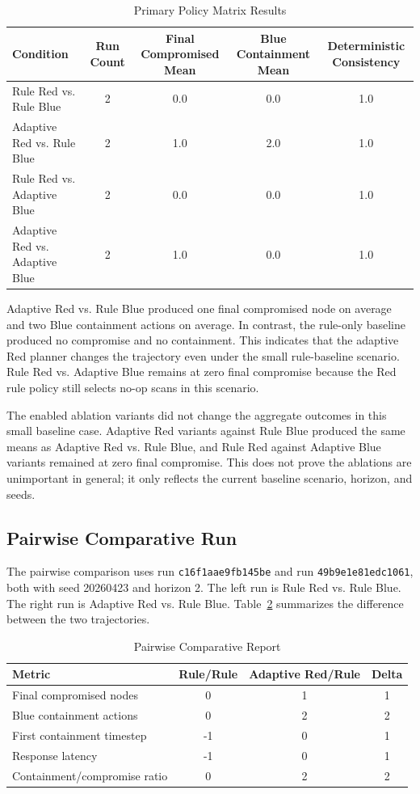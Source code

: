 \documentclass[conference]{IEEEtran}
\begin{document}
\begin{table}[htbp]
\centering
\caption{Primary Policy Matrix Results}
\label{tab:policy_results_comparison}
\begin{tabular}{|l|c|c|c|c|}
\hline
\textbf{Condition} & \textbf{Run Count} & \textbf{Final Compromised Mean} & \textbf{Blue Containment Mean} & \textbf{Deterministic Consistency} \\
\hline
Rule Red vs. Rule Blue & 2 & 0.0 & 0.0 & 1.0 \\
\hline
Adaptive Red vs. Rule Blue & 2 & 1.0 & 2.0 & 1.0 \\
\hline
Rule Red vs. Adaptive Blue & 2 & 0.0 & 0.0 & 1.0 \\
\hline
Adaptive Red vs. Adaptive Blue & 2 & 1.0 & 0.0 & 1.0 \\
\hline
\end{tabular}
\end{table}

Adaptive Red vs. Rule Blue produced one final compromised node on average and two Blue containment actions on average. In contrast, the rule-only baseline produced no compromise and no containment. This indicates that the adaptive Red planner changes the trajectory even under the small rule-baseline scenario. Rule Red vs. Adaptive Blue remains at zero final compromise because the Red rule policy still selects no-op scans in this scenario.

The enabled ablation variants did not change the aggregate outcomes in this small baseline case. Adaptive Red variants against Rule Blue produced the same means as Adaptive Red vs. Rule Blue, and Rule Red against Adaptive Blue variants remained at zero final compromise. This does not prove the ablations are unimportant in general; it only reflects the current baseline scenario, horizon, and seeds.

\subsection{Pairwise Comparative Run}
The pairwise comparison uses run \texttt{c16f1aae9fb145be} and run \texttt{49b9e1e81edc1061}, both with seed 20260423 and horizon 2. The left run is Rule Red vs. Rule Blue. The right run is Adaptive Red vs. Rule Blue. Table~\ref{tab:comparative_results} summarizes the difference between the two trajectories.

\begin{table}[H]
\centering
\caption{Pairwise Comparative Report}
\label{tab:comparative_results}
\begin{tabular}{|l|c|c|c|}
\hline
\textbf{Metric} & \textbf{Rule/Rule} & \textbf{Adaptive Red/Rule} & \textbf{Delta} \\
\hline
Final compromised nodes & 0 & 1 & 1 \\
\hline
Blue containment actions & 0 & 2 & 2 \\
\hline
First containment timestep & -1 & 0 & 1 \\
\hline
Response latency & -1 & 0 & 1 \\
\hline
Containment/compromise ratio & 0 & 2 & 2 \\
\hline
\end{tabular}
\end{table}
\end{document}
